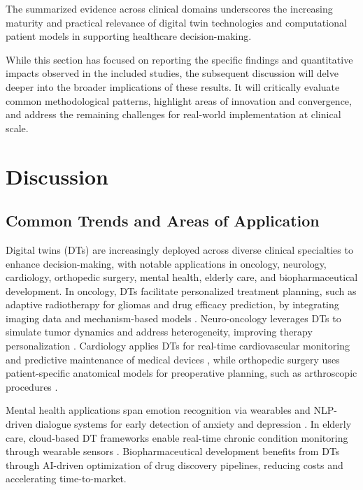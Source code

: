 \documentclass[10pt,a4paper]{article}
\begin{document}
The summarized evidence across clinical domains underscores the increasing maturity and practical relevance of digital twin technologies and computational patient models in supporting healthcare decision-making. 

While this section has focused on reporting the specific findings and quantitative impacts observed in the included studies, the subsequent discussion will delve deeper into the broader implications of these results. It will critically evaluate common methodological patterns, highlight areas of innovation and convergence, and address the remaining challenges for real-world implementation at clinical scale.

\section{Discussion}
\subsection*{Common Trends and Areas of Application}
Digital twins (DTs) are increasingly deployed across diverse clinical specialties to enhance decision-making, with notable applications in oncology, neurology, cardiology, orthopedic surgery, mental health, elderly care, and biopharmaceutical development. In oncology, DTs facilitate personalized treatment planning, such as adaptive radiotherapy for gliomas and drug efficacy prediction, by integrating imaging data and mechanism-based models \cite{Khater2024b, Vidovszky2024}. Neuro-oncology leverages DTs to simulate tumor dynamics and address heterogeneity, improving therapy personalization \cite{Vidovszky2024}. Cardiology applies DTs for real-time cardiovascular monitoring and predictive maintenance of medical devices \cite{Balasubramanyam2024}, while orthopedic surgery uses patient-specific anatomical models for preoperative planning, such as arthroscopic procedures \cite{bjelland2022}.  

Mental health applications span emotion recognition via wearables \cite{Tao2019} and NLP-driven dialogue systems for early detection of anxiety and depression \cite{Subramanian2022b}. In elderly care, cloud-based DT frameworks enable real-time chronic condition monitoring through wearable sensors \cite{liu2019}. Biopharmaceutical development benefits from DTs through AI-driven optimization of drug discovery pipelines, reducing costs and accelerating time-to-market.  
\end{document}
